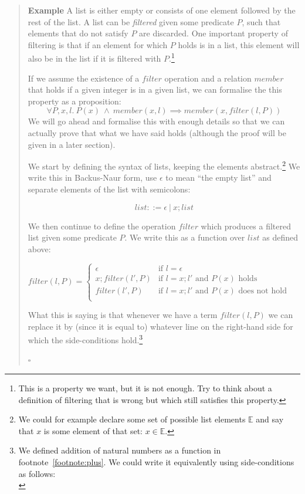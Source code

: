 \documentclass{tufte-handout}
\newcounter{example}
\newenvironment{example}
{\refstepcounter{example}\begin{quote}
\textbf{Example \arabic{example}}}
{

$\square$\end{quote}}
\begin{document}
\begin{example}\label{ex:filter}
  A list is either empty or consists of one element followed by
  the rest of the list. A list can be \emph{filtered} given some
  predicate $P$, such that elements that do not satisfy $P$ are
  discarded. One important property of filtering is that if an
  element for which $P$ holds is in a list, this element will also
  be in the list if it is filtered with $P$.\footnote{This is a
    property we want, but it is not enough. Try to think about a
    definition of filtering that is wrong but which still
    satisfies this property. }

  If we assume the existence of a $\mathit{filter}$ operation and
  a relation $\mathit{member}$ that holds if a given integer is in
  a given list, we can formalise the this property as a
  proposition:
  \[
    \forall P, x, l.~P(x) ~\land~ \mathit{member}(x, l)
    \implies
    \mathit{member}(x, \mathit{filter}(l, P))
  \]
  We will go ahead and formalise this with enough details so that
  we can actually prove that what we have said holds (although
  the proof will be given in a later section).

  We start by defining the syntax of lists, keeping the elements
  abstract.\footnote{We could for example declare some set of
    possible list elements $\mathbb{E}$ and say that $x$ is some
    element of that set: $x \in \mathbb{E}$.} We write this in
  Backus-Naur form, use $\epsilon$ to mean ``the empty list'' and
  separate elements of the list with semicolons:

  \[
      \mathit{list} ::= \epsilon ~|~ x; \mathit{list}
  \]

  \noindent
  We then continue to define the operation $\mathit{filter}$ which
  produces a filtered list given some predicate $P$. We write this
  as a function over $\mathit{list}$ as defined above:

  $\mathit{filter}(l, P) =
  \begin{cases}
    \epsilon & \text{if } l = \epsilon\\
    x; \mathit{filter}(l', P) & \text{if } l = x; l' \text{ and } P(x) \text{ holds}\\
    \mathit{filter}(l', P) & \text{if } l = x; l' \text{ and } P(x) \text{ does not hold}\\
  \end{cases}$

  \noindent
  What this is saying is that whenever we have a term
  $\mathit{filter}(l, P)$ we can replace it by (since it is equal
  to) whatever line on the right-hand side for which the
  side-conditions hold.\footnote{We defined addition of natural
    numbers as a function in footnote~\ref{footnote:plus}. We
    could write it equivalently using side-conditions as
    follows:\\\medskip

}
\end{example}
\end{document}

